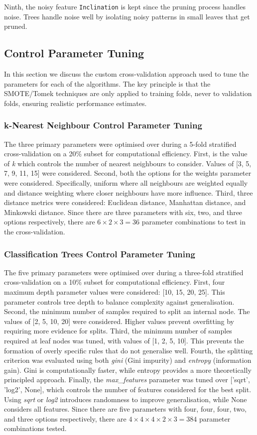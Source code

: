 \documentclass[10pt, conference]{IEEEtran}
\begin{document}
Ninth, the noisy feature \texttt{Inclination} is kept since the pruning process handles noise. Trees handle noise well by isolating noisy patterns in small leaves that get pruned.


\subsection{Control Parameter Tuning}
In this section we discuss the custom cross-validation approach used to tune the parameters for each of the algorithms. The key principle is that the SMOTE/Tomek techniques are only applied to training folds, never to validation folds, ensuring realistic performance estimates.
\subsubsection{k-Nearest Neighbour Control Parameter Tuning}
The three primary parameters were optimised over during a 5-fold stratified cross-validation on a 20\% subset for computational efficiency. First, is the value of \textit{k} which controls the number of nearest neighbours to consider. Values of [3, 5, 7, 9, 11, 15] were considered. Second, both the options for the weights parameter were considered. Specifically, uniform where all neighbours are weighted equally and distance weighting where closer neighbours have more influence. Third, three distance metrics were considered: Euclidean distance, Manhattan distance, and Minkowski distance. Since there are three parameters with six, two, and three options respectively, there are $6 \times 2 \times 3 = 36$ parameter combinations to test in the cross-validation. 
	
\subsubsection{Classification Trees Control Parameter Tuning}
The five primary parameters were optimised over during a three-fold stratified cross-validation on a 10\% subset for computational efficiency.  First, four maximum depth parameter values were considered: [10, 15, 20, 25]. This parameter controls tree depth to balance complexity against generalisation. Second, the minimum number of samples required to split an internal node. The values of [2, 5, 10, 20] were considered. Higher values prevent overfitting by requiring more evidence for splits. Third, the minimum number of samples required at leaf nodes was tuned, with values of [1, 2, 5, 10]. This prevents the formation of overly specific rules that do not generalise well. Fourth, the splitting criterion was evaluated using both \textit{gini} (Gini impurity) and \textit{entropy} (information gain). Gini is computationally faster, while entropy provides a more theoretically principled approach. Finally, the \textit{max\_features} parameter was tuned over ['sqrt', 'log2', None], which controls the number of features considered for the best split. Using \textit{sqrt} or \textit{log2} introduces randomness to improve generalisation, while None considers all features. Since there are five parameters with four, four, four, two, and three options respectively, there are $4 \times 4 \times 4 \times 2 \times 3 = 384$ parameter combinations tested. 
\end{document}
